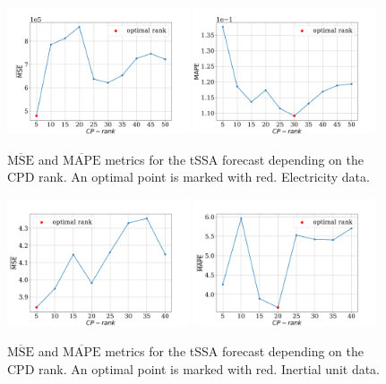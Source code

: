 \documentclass[referee, pdflatex, sn-mathphys-num]{sn-jnl}
\theoremstyle{definition}
\theoremstyle{plain}
\begin{document}
	\begin{figure}[h]
		\centering
		\includegraphics[width=0.48\textwidth, keepaspectratio]{pred_MSE_rank_elec.png}
		\includegraphics[width=0.48\textwidth, keepaspectratio]{pred_MAPE_rank_elec.png}
		\caption{$ \overline{\text{MSE}} $ and $ \overline{\text{MAPE}} $ metrics for the tSSA forecast depending on the CPD rank. An optimal point is marked with red. Electricity data.}\label{fig:mse_mape_electr}
	\end{figure}
	
	\begin{figure}[h]
		\centering
		\includegraphics[width=0.48\textwidth, keepaspectratio]{pred_MSE_rank_motion.png}
		\includegraphics[width=0.48\textwidth, keepaspectratio]{pred_MAPE_rank_motion.png}
		\caption{$ \overline{\text{MSE}} $ and $ \overline{\text{MAPE}} $ metrics for the tSSA forecast depending on the CPD rank. An optimal point is marked with red. Inertial unit data.}\label{fig:mse_mape_motion}
	\end{figure}
	
\end{document}
